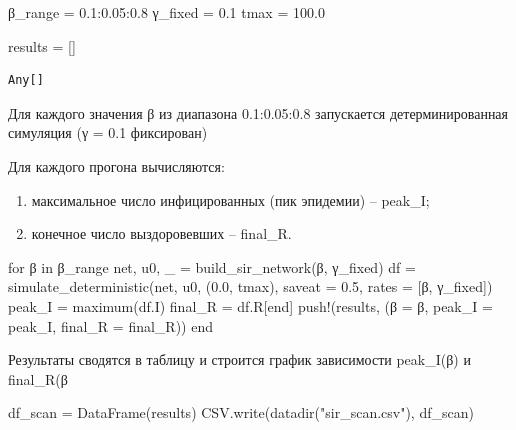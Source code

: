 \documentclass[
  12pt,
  a4paper,
  DIV=11,
  numbers=noendperiod]{scrreprt}
\newenvironment{Shaded}{\begin{snugshade}}{\end{snugshade}}
\newcommand{\ControlFlowTok}[1]{\textcolor[rgb]{0.00,0.23,0.31}{#1}}
\newcommand{\FloatTok}[1]{\textcolor[rgb]{0.68,0.00,0.00}{#1}}
\newcommand{\FunctionTok}[1]{\textcolor[rgb]{0.28,0.35,0.67}{#1}}
\newcommand{\KeywordTok}[1]{\textcolor[rgb]{0.00,0.23,0.31}{#1}}
\newcommand{\NormalTok}[1]{\textcolor[rgb]{0.00,0.23,0.31}{#1}}
\newcommand{\OperatorTok}[1]{\textcolor[rgb]{0.37,0.37,0.37}{#1}}
\newcommand{\StringTok}[1]{\textcolor[rgb]{0.13,0.47,0.30}{#1}}
\begin{document}
\begin{Shaded}
\begin{Highlighting}[]
\NormalTok{β\_range }\OperatorTok{=} \FloatTok{0.1}\OperatorTok{:}\FloatTok{0.05}\OperatorTok{:}\FloatTok{0.8}
\NormalTok{γ\_fixed }\OperatorTok{=} \FloatTok{0.1}
\NormalTok{tmax }\OperatorTok{=} \FloatTok{100.0}

\NormalTok{results }\OperatorTok{=}\NormalTok{ []}
\end{Highlighting}
\end{Shaded}

\begin{verbatim}
Any[]
\end{verbatim}

Для каждого значения β из диапазона 0.1:0.05:0.8 запускается
детерминированная симуляция (γ = 0.1 фиксирован)

Для каждого прогона вычисляются:

\begin{enumerate}
\def\labelenumi{\arabic{enumi}.}
\item
  максимальное число инфицированных (пик эпидемии) -- peak\_I;
\item
  конечное число выздоровевших -- final\_R.
\end{enumerate}

\begin{Shaded}
\begin{Highlighting}[]
\ControlFlowTok{for}\NormalTok{ β }\KeywordTok{in}\NormalTok{ β\_range}
\NormalTok{    net, u0, \_ }\OperatorTok{=} \FunctionTok{build\_sir\_network}\NormalTok{(β, γ\_fixed)}
\NormalTok{    df }\OperatorTok{=} \FunctionTok{simulate\_deterministic}\NormalTok{(net, u0, (}\FloatTok{0.0}\NormalTok{, tmax), saveat }\OperatorTok{=} \FloatTok{0.5}\NormalTok{, rates }\OperatorTok{=}\NormalTok{ [β, γ\_fixed])}
\NormalTok{    peak\_I }\OperatorTok{=} \FunctionTok{maximum}\NormalTok{(df.I)}
\NormalTok{    final\_R }\OperatorTok{=}\NormalTok{ df.R[}\KeywordTok{end}\NormalTok{]}
    \FunctionTok{push!}\NormalTok{(results, (β }\OperatorTok{=}\NormalTok{ β, peak\_I }\OperatorTok{=}\NormalTok{ peak\_I, final\_R }\OperatorTok{=}\NormalTok{ final\_R))}
\ControlFlowTok{end}
\end{Highlighting}
\end{Shaded}

Результаты сводятся в таблицу и строится график зависимости peak\_I(β) и
final\_R(β

\begin{Shaded}
\begin{Highlighting}[]
\NormalTok{df\_scan }\OperatorTok{=} \FunctionTok{DataFrame}\NormalTok{(results)}
\NormalTok{CSV.}\FunctionTok{write}\NormalTok{(}\FunctionTok{datadir}\NormalTok{(}\StringTok{"sir\_scan.csv"}\NormalTok{), df\_scan)}
\end{Highlighting}
\end{Shaded}
\end{document}
